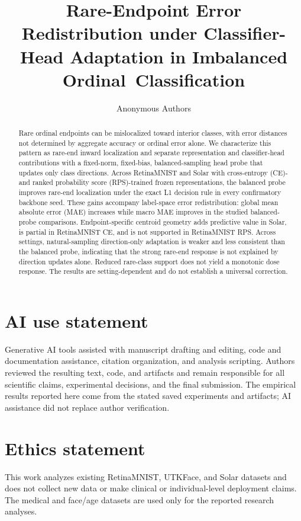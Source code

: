 \documentclass{article}
\title{Rare-Endpoint Error Redistribution under Classifier-Head Adaptation in Imbalanced \mbox{Ordinal Classification}}
\author{Anonymous Authors}
\begin{document}
\maketitle
\begin{abstract}Rare ordinal endpoints can be mislocalized toward interior classes, with error distances not determined by aggregate accuracy or ordinal error alone. We characterize this pattern as rare-end inward localization and separate representation and classifier-head contributions with a fixed-norm, fixed-bias, balanced-sampling head probe that updates only class directions. Across RetinaMNIST and Solar with cross-entropy (CE)- and ranked probability score (RPS)-trained frozen representations, the balanced probe improves rare-end localization under the exact L1 decision rule in every confirmatory backbone seed. These gains accompany label-space error redistribution: global mean absolute error (MAE) increases while macro MAE improves in the studied balanced-probe comparisons. Endpoint-specific centroid geometry adds predictive value in Solar, is partial in RetinaMNIST CE, and is not supported in RetinaMNIST RPS. Across settings, natural-sampling direction-only adaptation is weaker and less consistent than the balanced probe, indicating that the strong rare-end response is not explained by direction updates alone. Reduced rare-class support does not yield a monotonic dose response. The results are setting-dependent and do not establish a universal correction.\end{abstract}

\section*{AI use statement}Generative AI tools assisted with manuscript drafting and editing, code and documentation assistance, citation organization, and analysis scripting. Authors reviewed the resulting text, code, and artifacts and remain responsible for all scientific claims, experimental decisions, and the final submission. The empirical results reported here come from the stated saved experiments and artifacts; AI assistance did not replace author verification.
\section*{Ethics statement}This work analyzes existing RetinaMNIST, UTKFace, and Solar datasets and does not collect new data or make clinical or individual-level deployment claims. The medical and face/age datasets are used only for the reported research analyses.
\end{document}
